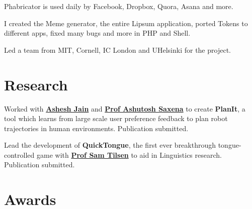 \documentclass[letterpaper]{deedy-resume} %
\begin{document}
\begin{minipage}[t]{0.66\textwidth}
\begin{tightitemize}
\item Phabricator is used daily by Facebook, Dropbox, Quora, Asana and more.
\item I created the Meme generator, the entire Lipsum application, ported Tokens to different apps, fixed many bugs and more in PHP and Shell.
\item Led a team from MIT, Cornell, IC London and UHelsinki for the project.
\end{tightitemize}

\sectionspace %


\section{Research}


Worked with \textbf{\href{http://www.cs.cornell.edu/~ashesh/}{Ashesh Jain}} and \textbf{\href{http://www.cs.cornell.edu/~asaxena/}{Prof Ashutosh Saxena}} to create \textbf{PlanIt}, a tool which learns from large scale user preference feedback to plan robot trajectories in human environments. Publication submitted.

\sectionspace %



Lead the development of \textbf{QuickTongue}, the first ever breakthrough tongue-controlled game with \textbf{\href{http://conf.ling.cornell.edu/~tilsen/}{Prof Sam Tilsen}} to aid in Linguistics research. Publication submitted.

\sectionspace %


\section{Awards} 


\end{minipage}
\end{document}
